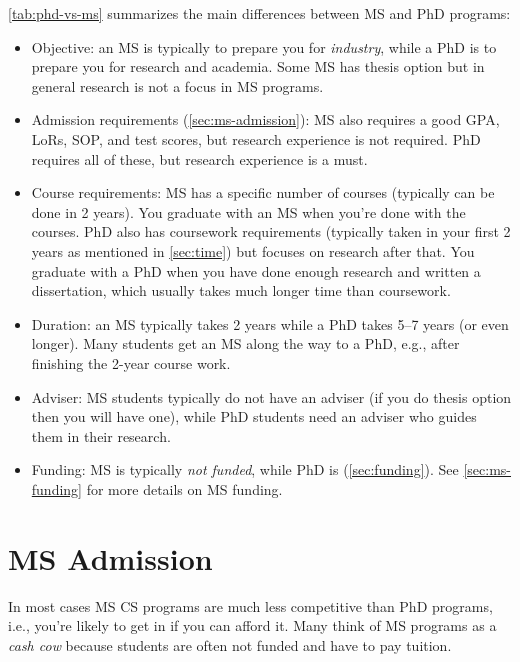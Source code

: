 \documentclass[oneside,11pt,dvipsnames]{book}
\begin{document}
\autoref{tab:phd-vs-ms} summarizes the main differences between MS and PhD programs:
\begin{itemize}

  \item Objective: an MS is typically to prepare you for \emph{industry}, while a PhD is to prepare you for research and academia. Some MS has thesis option but in general research is not a focus in MS programs.

  \item Admission requirements (\autoref{sec:ms-admission}): MS also requires a good GPA, LoRs, SOP, and test scores, but research experience is not required.  PhD requires all of these, but research experience is a must.
  
  \item Course requirements: MS has a specific number of courses (typically can be done in 2 years). You graduate with an MS when you're done with the courses. PhD also has coursework requirements (typically taken in your first 2 years as mentioned in \autoref{sec:time}) but focuses on research after that.  You graduate with a PhD when you have done enough research and written a dissertation, which usually takes much longer time than coursework.
  
  \item Duration: an MS typically takes 2 years while a PhD takes 5--7 years (or even longer).  Many students get an MS along the way to a PhD, e.g., after finishing the 2-year course work.
  
  \item Adviser: MS students typically do not have an adviser (if you do thesis option then you will have one), while PhD students need an adviser who guides them in their research.
  
  \item Funding: MS is typically \emph{not funded}, while PhD is (\autoref{sec:funding}). See \autoref{sec:ms-funding} for more details on MS funding.
  
\end{itemize}

\section{MS Admission}\label{sec:ms-admission}

In most cases MS CS programs are much less competitive than PhD programs, i.e., you're likely to get in if you can afford it. Many think of MS programs as a \emph{cash cow} because students are often not funded and have to pay tuition. 
\end{document}
